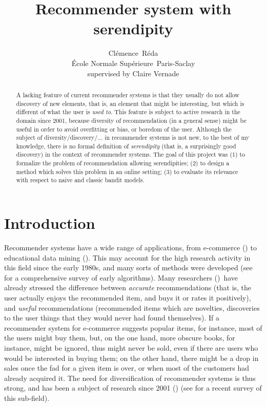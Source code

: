 \documentclass{article}
\title{Recommender system with serendipity}
\author{
  Cl\'{e}mence~R\'{e}da\\
  \'{E}cole Normale Supérieure~Paris-Saclay\\
  supervised by Claire Vernade\\
}
\begin{document}

\maketitle

\begin{abstract}
A lacking feature of current recommender systems is that they usually do not allow discovery of new elements, that is, an element that might be interesting, but which is different of what the user is \textit{used to}. This feature is subject to active research in the domain since 2001, because diversity of recommendation (in a general sense) might be useful in order to avoid overfitting or bias, or boredom of the user. Although the subject of diversity/discovery/... in recommender systems is not new, to the best of my knowledge, there is no formal definition of \textit{serendipity} (that is, a surprisingly good discovery) in the context of recommender systems. The goal of this project was (1) to formalize the problem of recommendation allowing serendipities; (2) to design a method which solves this problem in an online setting; (3) to evaluate its relevance with respect to naive and classic bandit models.
\end{abstract}

\section{Introduction}

Recommender systems have a wide range of applications, from e-commerce (\cite{smith2017two}) to educational data mining (\cite{tang2003smart}). This may account for the high research activity in this field since the early 1980s, and many sorts of methods were developed (see \cite{adomavicius2005toward} for a comprehensive survey of early algorithms). Many researchers (\cite{abbassi2009getting,kunaver2017diversity,zhou2010solving}) have already stressed the difference between \textit{accurate} recommendations (that is, the user actually enjoys the recommended item, and buys it or rates it positively), and \textit{useful} recommendations (recommended items which are novelties, discoveries to the user things that they would never had found themselves). If a recommender system for e-commerce suggests popular items, for instance, most of the users might buy them, but, on the one hand, more obscure books, for instance, might be ignored, thus might never be sold, even if there are users who would be interested in buying them; on the other hand, there might be a drop in sales once the fad for a given item is over, or when most of the customers had already acquired it. The need for diversification of recommender systems is thus strong, and has been a subject of research since 2001 (\cite{bradley2001improving}) (see \cite{kunaver2017diversity} for a recent survey of this sub-field).
\end{document}
